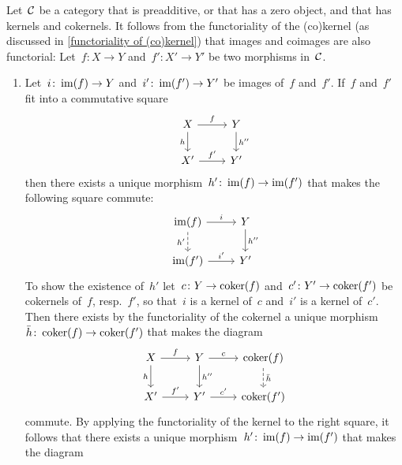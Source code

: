 \begin{remark*}
  \label{functoriality of (co)image}
  Let~$\mathcal{C}$ be a category that is preadditive, or that has a zero object, and that has kernels and cokernels.
  It follows from the functoriality of the (co)kernel (as discussed in \cref{functoriality of (co)kernel}) that images and coimages are also functorial:
  Let~$f \colon X \to Y$ and~$f' \colon X' \to Y'$ be two morphisms in~$\mathcal{C}$.
  \begin{enumerate}
    \item
      Let~$i \colon \operatorname{im}(f) \to Y$ and~$i' \colon \operatorname{im}(f') \to Y'$ be images of~$f$ and~$f'$.
      If~$f$ and~$f'$ fit into a commutative square
      \[
        \begin{tikzcd}
            X
            \arrow{r}[above]{f}
            \arrow{d}[left]{h}
          & Y
            \arrow{d}[right]{h''}
          \\
            X'
            \arrow{r}[above]{f'}
          & Y'
        \end{tikzcd}
      \]
      then there exists a unique morphism~$h' \colon \operatorname{im}(f) \to \operatorname{im}(f')$ that makes the following square commute:
      \[
        \begin{tikzcd}
            \im(f)
            \arrow{r}[above]{i}
            \arrow[dashed]{d}[left]{h'}
          & Y
            \arrow{d}[right]{h''}
          \\
            \im(f')
            \arrow{r}[above]{i'}
          & Y'
        \end{tikzcd}
      \]
      To show the existence of~$h'$ let~$c \colon Y \to \operatorname{coker}(f)$ and~$c' \colon Y' \to \operatorname{coker}(f')$ be cokernels of~$f$, resp.~$f'$, so that~$i$ is a kernel of~$c$ and~$i'$ is a kernel of~$c'$.
      Then there exists by the functoriality of the cokernel a unique morphism~$\bar{h} \colon \operatorname{coker}(f) \to \operatorname{coker}(f')$ that makes the diagram
      \[
        \begin{tikzcd}
            X
            \arrow{r}[above]{f}
            \arrow{d}[left]{h}
          & Y
            \arrow{r}[above]{c}
            \arrow{d}[right]{h''}
          & \coker(f)
            \arrow[dashed]{d}[right]{\bar{h}}
          \\
            X'
            \arrow{r}[above]{f'}
          & Y'
            \arrow{r}[above]{c'}
          & \coker(f')
        \end{tikzcd}
      \]
      commute.
      By applying the functoriality of the kernel to the right square, it follows that there exists a unique morphism~$h' \colon \operatorname{im}(f) \to \operatorname{im}(f')$ that makes the diagram

\end{enumerate}
\end{remark*}
